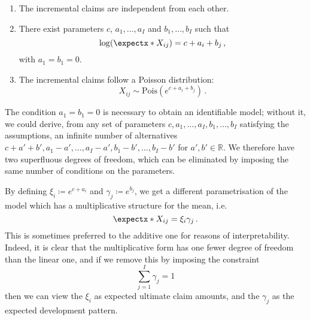 \documentclass[a4paper]{book}
\begin{document}
\begin{model} \leavevmode \label{model:poisson}
  \begin{enumerate}[label=\bf{\textup{(}Pois\arabic*\textup{)}},ref=\textup{(}Pois\arabic*\textup{)}, wide]
    \item \label{assump:poisson1}
          The incremental claims are independent from each other.
    \item \label{assump:poisson2}
          There exist parameters $c$, $a_1, \dots, a_I$ and $b_1, \dots, b_I$ such that
          \begin{equation} \label{eq:linear-predictor-poisson}
            \log(\expect{X_{ij}}) = c + a_i + b_j \,,
          \end{equation}
          with $a_1 = b_1 = 0$.
    \item \label{assump:poisson3}
          The incremental claims follow a Poisson distribution:
          \begin{equation}
            X_{ij} \sim \mathrm{Pois}(e^{c + a_i + b_j}) \,.
          \end{equation}
  \end{enumerate}
\end{model}

The condition $a_1 = b_1 = 0$ is necessary to obtain an identifiable model; without it, we could derive, from any set of parameters $c, a_1, \dots, a_I, b_1, \dots, b_I$ satisfying the assumptions, an infinite number of alternatives $c + a' + b', a_1 - a', \dots, a_I - a', b_1 - b', \dots, b_I - b'$ for $a', b' \in \mathbb{R}$. We therefore have two superfluous degrees of freedom, which can be eliminated by imposing the same number of conditions on the parameters.

By defining $\xi_i \coloneqq e^{c + a_i}$ and $\gamma_j \coloneqq e^{b_j}$, we get a different parametrisation of the model which has a multiplicative structure for the mean, i.e.\
\begin{equation}
  \expect{X_{ij}} = \xi_i \gamma_j \,.
\end{equation}
This is sometimes preferred to the additive one for reasons of interpretability. Indeed, it is clear that the multiplicative form has one fewer degree of freedom than the linear one, and if we remove this by imposing the constraint
\begin{equation}
  \sum_{j = 1}^I \gamma_j = 1
\end{equation}
then we can view the $\xi_i$ as expected ultimate claim amounts, and the $\gamma_j$ as the expected development pattern.
\end{document}
